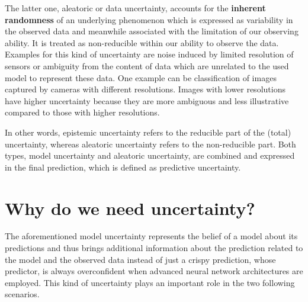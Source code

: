 The latter one, aleatoric or data uncertainty, accounts for the \textbf{inherent randomness} of an underlying phenomenon which is expressed as variability in the observed data and meanwhile associated with the limitation of our observing ability. It is treated as non-reducible within our ability to observe the data. Examples for this kind of uncertainty are noise induced by limited resolution of sensors or ambiguity from the content of data which are unrelated to the used model to represent these data. One example can be classification of images captured by cameras with different resolutions. Images with lower resolutions have higher uncertainty because they are more ambiguous and less illustrative compared to those with higher resolutions. 

In other words, epistemic uncertainty refers to the reducible part of the (total) uncertainty, whereas aleatoric uncertainty refers to the non-reducible part. 
Both types, model uncertainty and aleatoric uncertainty, are combined and expressed in the final prediction, which is defined as predictive uncertainty.

\section{Why do we need uncertainty?}
The aforementioned model uncertainty represents the belief of a model about its predictions and thus brings additional information about the prediction related to the model and the observed data instead of just a crispy prediction, whose predictor, is always overconfident when advanced neural network architectures are employed\cite{guo2017calibration}. 
This kind of uncertainty plays an important role in the two following scenarios. 

